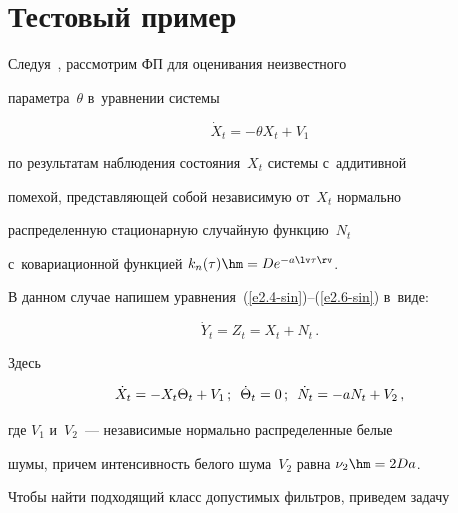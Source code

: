 \vspace*{-6pt}





\section{Тестовый пример}





Следуя~\cite{2-sin}, рассмотрим  ФП для оценивания неизвестного


параметра~$\theta$ в~уравнении системы


\begin{equation*}


\dot X_t =-\theta X_t +V_1 %


\end{equation*}


по результатам наблюдения состояния~$X_t$ системы с~аддитивной


помехой, представляющей собой независимую от~$X_t$ нормально


распределенную стационарную случайную функцию~$N_t$ 


с~ковариационной функцией $k_n(\tau) \hm= De^{-a\lv\tau\rv}$.





В данном случае напишем уравнения~(\ref{e2.4-sin})--(\ref{e2.6-sin}) в~виде:


\begin{equation}


\dot Y_t = Z_t=X_t+N_t\,.


    \label{e5.2-sin}


    \end{equation}


    Здесь


    $$


\dot X_t =-X_t\Theta_t + V_1\,;\enskip \dot\Theta_t =0\,;


    \enskip \dot N_t =-aN_t+V_2\,,


    $$


где  $V_1$ и~$V_2$~---  независимые нормально распределенные белые


шумы, причем интенсивность белого шума~$V_2$ равна  $\nu_2 \hm= 2Da$.





Чтобы найти подходящий класс допустимых фильтров, приведем задачу


